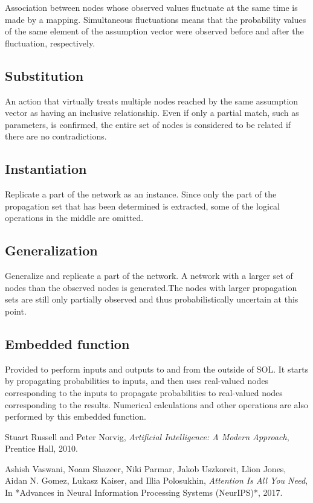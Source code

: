 \documentclass[12pt]{article}
\begin{document}
Association between nodes whose observed values fluctuate at the same
time is made by a mapping. Simultaneous fluctuations means that the
probability values of the same element of the assumption vector were
observed before and after the fluctuation, respectively.

\subsection*{Substitution}\label{glossary-substitution}

An action that virtually treats multiple nodes reached by the same
assumption vector as having an inclusive relationship. Even if only a
partial match, such as parameters, is confirmed, the entire set of nodes
is considered to be related if there are no contradictions.

\subsection*{Instantiation}\label{glossary-instantiation}

Replicate a part of the network as an instance. Since only the part of
the propagation set that has been determined is extracted, some of the
logical operations in the middle are omitted.

\subsection*{Generalization}\label{glossary-generalization}

Generalize and replicate a part of the network. A network with a larger
set of nodes than the observed nodes is generated.The nodes with larger
propagation sets are still only partially observed and thus
probabilistically uncertain at this point.

\subsection*{Embedded function}\label{glossary-embedded-function}

Provided to perform inputs and outputs to and from the outside of SOL.
It starts by propagating probabilities to inputs, and then uses
real-valued nodes corresponding to the inputs to propagate probabilities
to real-valued nodes corresponding to the results. Numerical
calculations and other operations are also performed by this embedded
function.


\begin{thebibliography}{99}

Stuart Russell and Peter Norvig,
\textit{Artificial Intelligence: A Modern Approach},
Prentice Hall, 2010.

Ashish Vaswani, Noam Shazeer, Niki Parmar, Jakob Uszkoreit, Llion Jones, Aidan N. Gomez, Lukasz Kaiser, and Illia Polosukhin,
\textit{Attention Is All You Need},
In *Advances in Neural Information Processing Systems (NeurIPS)*, 2017.

\end{thebibliography}
\end{document}
